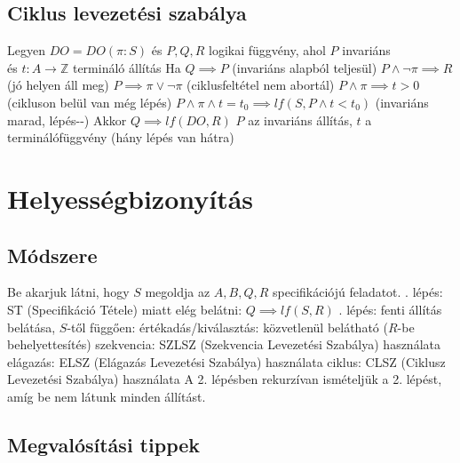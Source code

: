 \documentclass[12pt,a4paper]{article}
\begin{document}
\subsection{Ciklus levezetési szabálya}

\begin{outline}
	\1 Legyen $DO=DO(\pi:S)$ és $P,Q,R$ logikai függvény, ahol $P$ invariáns\\
	és $t:A \to \mathbb{Z}$ termináló állítás
	\1 Ha
		\2 $Q \implies P$ \;\; (invariáns alapból teljesül)
		\2 $P \wedge \lnot \pi \implies R$ \;\; (jó helyen áll meg)
		\2 $P \implies \pi \lor \lnot \pi$ \;\; (ciklusfeltétel nem abortál)
		\2 $P \wedge \pi \implies t > 0$ \;\; (cikluson belül van még lépés)
		\2 $P \wedge \pi \wedge t = t_0 \implies lf(S,P \wedge t<t_0)$ \;\; (invariáns marad, lépés\;-\;-)
	\1 Akkor $Q \implies lf(DO,R)$
	\1 $P$ az invariáns állítás, $t$ a terminálófüggvény (hány lépés van hátra)
\end{outline}

\pagebreak

\section{Helyességbizonyítás}

\subsection{Módszere}

\begin{outline}
	\1 Be akarjuk látni, hogy $S$ megoldja az $A,B,Q,R$ specifikációjú feladatot.
	. lépés: ST (Specifikáció Tétele) miatt elég belátni: $Q \implies lf(S,R)$
	. lépés: fenti állítás belátása, $S$-től függően:
		\2 értékadás/kiválasztás: közvetlenül belátható ($R$-be behelyettesítés)
		\2 szekvencia: SZLSZ (Szekvencia Levezetési Szabálya) használata
		\2 elágazás: ELSZ (Elágazás Levezetési Szabálya) használata
		\2 ciklus: CLSZ (Ciklusz Levezetési Szabálya) használata
	\1 A 2. lépésben rekurzívan ismételjük a 2. lépést, amíg be nem látunk minden állítást.
\end{outline}

\subsection{Megvalósítási tippek}
\end{document}
